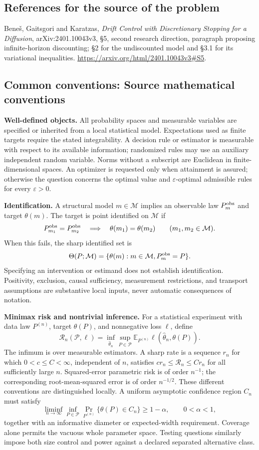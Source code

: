 \documentclass[11pt,a4paper]{article}
\newcommand{\E}{\mathbb E}
\begin{document}
\subsection*{References for the source of the problem}
Bene\v{s}, Gaitsgori and Karatzas, \emph{Drift Control with Discretionary
Stopping for a Diffusion}, arXiv:2401.10043v3, \S5, second research
direction, paragraph proposing infinite-horizon discounting;
\S2 for the undiscounted model and \S3.1 for its variational inequalities.
\url{https://arxiv.org/html/2401.10043v3#S5}.

\subsection*{Common conventions: Source mathematical conventions}

\textbf{Well-defined objects.}
All probability spaces and measurable variables are specified or inherited
from a local statistical model. Expectations used as finite targets require
the stated integrability. A decision rule or estimator is measurable with
respect to its available information; randomized rules may use an auxiliary
independent random variable. Norms without a subscript are Euclidean in
finite-dimensional spaces. An optimizer is requested only when attainment
is assured; otherwise the question concerns the optimal value and
$\varepsilon$-optimal admissible rules for every $\varepsilon>0$.

\textbf{Identification.}
A structural model $m\in\mathcal M$ implies an observable law
$P_m^{\rm obs}$ and target $\theta(m)$. The target is point identified on
$\mathcal M$ if
\[
 P_{m_1}^{\rm obs}=P_{m_2}^{\rm obs}
 \quad\Longrightarrow\quad\theta(m_1)=\theta(m_2)
 \qquad(m_1,m_2\in\mathcal M).
\]
When this fails, the sharp identified set is
\[
 \Theta(P;\mathcal M)=\{\theta(m):m\in\mathcal M,
                                  P_m^{\rm obs}=P\}.
\]
Specifying an intervention or estimand does not establish identification.
Positivity, exclusion, causal sufficiency, measurement restrictions, and
transport assumptions are substantive local inputs, never automatic
consequences of notation.

\textbf{Minimax risk and nontrivial inference.}
For a statistical experiment with data law $P^{(n)}$, target $\theta(P)$,
and nonnegative loss $\ell$, define
\[
 \mathcal R_n(\mathcal P,\ell)
   =\inf_{\widehat\theta_n}\sup_{P\in\mathcal P}
      \E_{P^{(n)}}\ell(\widehat\theta_n,\theta(P)).
\]
The infimum is over measurable estimators. A sharp rate is a sequence
$r_n$ for which $0<c\leq C<\infty$, independent of $n$, satisfies
$c r_n\leq\mathcal R_n\leq C r_n$ for all sufficiently large $n$.
Squared-error parametric risk is of order $n^{-1}$; the corresponding
root-mean-squared error is of order $n^{-1/2}$. These different conventions
are distinguished locally. A uniform asymptotic confidence region $C_n$
must satisfy
\[
 \liminf_{n\to\infty}\inf_{P\in\mathcal P}
     \Pr_{P^{(n)}}\{\theta(P)\in C_n\}\geq 1-\alpha,
 \qquad 0<\alpha<1,
\]
together with an informative diameter or expected-width requirement.
Coverage alone permits the vacuous whole parameter space. Testing questions
similarly impose both size control and power against a declared separated
alternative class.
\end{document}
